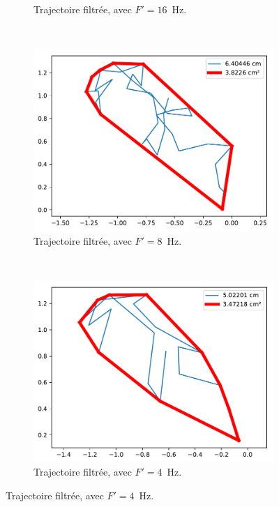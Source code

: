 \begin{figure}[!htb]
\begin{subfigure}[t]{0.49\textwidth}
			\caption{Trajectoire filtrée, avec $F' = 16$~Hz.}
			\label{fig:filterFw16}
		\end{subfigure}
		~
		\begin{subfigure}[t]{0.49\textwidth}
			\centering
			\includegraphics[width=\textwidth]{figures/ch5/2_19_freqFilter_2_19_120_32_filter_8}
			\caption{Trajectoire filtrée, avec $F' = 8$~Hz.}
			\label{fig:filterFw8}
		\end{subfigure}		
		~
		\begin{subfigure}[t]{0.49\textwidth}
			\centering
			\includegraphics[width=\textwidth]{figures/ch5/2_19_freqFilter_2_19_120_32_filter_4}
			\caption{Trajectoire filtrée, avec $F' = 4$~Hz.}
			\label{fig:filterFw4}
		\end{subfigure}

\end{figure}
